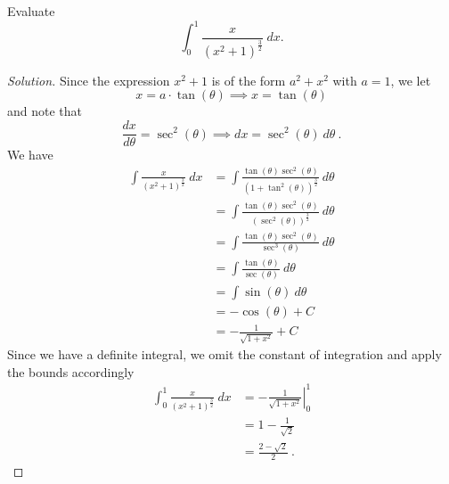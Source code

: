 \documentclass[compacto,10pt,comentarios]{aleph-notas}
\begin{document}
\begin{ejer}
    Evaluate
    $$
        \int_{0}^{1} \frac{x}{(x^{2} + 1)^{\frac{3}{2}}} ~ dx.
    $$
\end{ejer}
\begin{proof}[Solution]
    Since the expression $x^{2} + 1$ is of the form $a^{2} + x^{2}$ with $a = 1$, we let
    $$
        x = a \cdot \tan(\theta) \implies x = \tan(\theta)
    $$
    and note that
    $$
        \frac{dx}{d\theta} = \sec^{2}(\theta) \implies dx = \sec^{2}(\theta) ~ d\theta  ~.
    $$
    We have
    \begin{align*}
        \int \frac{x}{(x^{2} + 1)^{\frac{3}{2}}} ~ dx
        & = \int \frac{\tan(\theta) \sec^{2}(\theta)}{(1 + \tan^{2}(\theta))^{\frac{3}{2}}} ~ d\theta \\
        & = \int \frac{\tan(\theta) \sec^{2}(\theta)}{(\sec^{2}(\theta))^{\frac{3}{2}}} ~ d\theta \\
        & = \int \frac{\tan(\theta) \sec^{2}(\theta)}{\sec^{3}(\theta)} ~ d\theta \\
        & = \int \frac{\tan(\theta)}{\sec(\theta)} ~ d\theta \\
        & = \int \sin(\theta) ~ d\theta \\
        & = - \cos(\theta) + C \\
        & = - \frac{1}{\sqrt{1 + x^2}} + C
    \end{align*}
    Since we have a definite integral, we omit the constant of integration and apply the bounds accordingly
    \begin{align*}
        \int_{0}^{1} \frac{x}{(x^{2} + 1)^{\frac{3}{2}}} ~ dx
        & = \left.   - \frac{1}{\sqrt{1 + x^2}} \right\rvert_{0}^{1} \\
        & = 1 - \frac{1}{\sqrt{2}} \\
        & = \frac{2 - \sqrt{2}}{2} ~ .
    \end{align*}
\end{proof}

\end{document}

